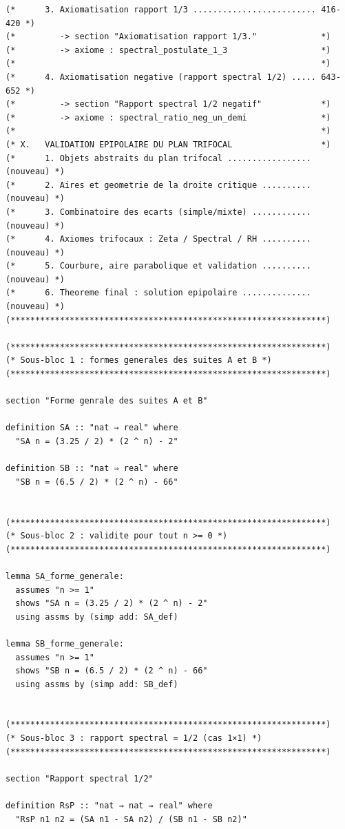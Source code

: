 \documentclass[a4paper,11pt]{article}
\begin{document}
\begin{holcode}[title={\textcolor{white}{File: methode\_spectral.thy -- Part 1/4}}]
\begin{lstlisting}
(*      3. Axiomatisation rapport 1/3 ......................... 416-420 *)
(*         -> section "Axiomatisation rapport 1/3."             *)
(*         -> axiome : spectral_postulate_1_3                   *)
(*                                                              *)
(*      4. Axiomatisation negative (rapport spectral 1/2) ..... 643-652 *)
(*         -> section "Rapport spectral 1/2 negatif"            *)
(*         -> axiome : spectral_ratio_neg_un_demi               *)
(*                                                              *)
(* X.   VALIDATION EPIPOLAIRE DU PLAN TRIFOCAL                  *)
(*      1. Objets abstraits du plan trifocal ................. (nouveau) *)
(*      2. Aires et geometrie de la droite critique .......... (nouveau) *)
(*      3. Combinatoire des ecarts (simple/mixte) ............ (nouveau) *)
(*      4. Axiomes trifocaux : Zeta / Spectral / RH .......... (nouveau) *)
(*      5. Courbure, aire parabolique et validation .......... (nouveau) *)
(*      6. Theoreme final : solution epipolaire .............. (nouveau) *)
(****************************************************************)

(****************************************************************)
(* Sous-bloc 1 : formes generales des suites A et B *)
(****************************************************************)

section "Forme genrale des suites A et B"

definition SA :: "nat ⇒ real" where
  "SA n = (3.25 / 2) * (2 ^ n) - 2"

definition SB :: "nat ⇒ real" where
  "SB n = (6.5 / 2) * (2 ^ n) - 66"


(****************************************************************)
(* Sous-bloc 2 : validite pour tout n >= 0 *)
(****************************************************************)

lemma SA_forme_generale:
  assumes "n >= 1"
  shows "SA n = (3.25 / 2) * (2 ^ n) - 2"
  using assms by (simp add: SA_def)

lemma SB_forme_generale:
  assumes "n >= 1"
  shows "SB n = (6.5 / 2) * (2 ^ n) - 66"
  using assms by (simp add: SB_def)


(****************************************************************)
(* Sous-bloc 3 : rapport spectral = 1/2 (cas 1×1) *)
(****************************************************************)

section "Rapport spectral 1/2"

definition RsP :: "nat ⇒ nat ⇒ real" where
  "RsP n1 n2 = (SA n1 - SA n2) / (SB n1 - SB n2)"


\end{lstlisting}
\end{holcode}
\end{document}
